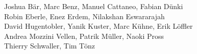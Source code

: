 %
%
%
Joshua Bär,			%
Marc Benz,			%
Manuel Cattaneo,		%
Fabian Dünki%
\\
Robin Eberle,			%
Enez Erdem,			%
Nilakshan Eswararajah%
\\
David Hugentobler,		%
Yanik Kuster,			%
Marc Kühne,			%
Erik Löffler%
\\
Andrea Mozzini Vellen,		%
Patrik Müller,			%
Naoki Pross%
\\
Thierry Schwaller,		%
Tim Tönz			%

